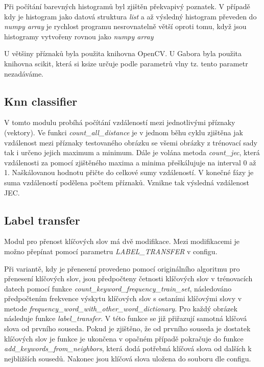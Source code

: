 \documentclass[czech,BP]{thesiskiv}
\begin{document}
\par Při počítání barevných histogramů byl zjištěn překvapivý poznatek. V případě kdy je histogram jako datová struktura \textit{list} a až výsledný histogram převeden do \textit{numpy array} je rychlost programu nesrovnatelně větší oproti tomu, když jsou histogramy vytvořeny rovnou jako \textit{numpy array}  

\par U většiny příznaků byla použita knihovna OpenCV. U Gabora byla použita knihovna scikit, která si ksize určuje podle parametrů vlny tz. tento parametr nezadáváme.
  
  
\subsection{Knn classifier}
\par V tomto modulu probíhá počítání vzdáleností mezi jednotlivými příznaky (vektory). Ve funkci \textit{count\_all\_distance} je v jednom běhu cyklu zjištěna jak vzdálenost mezi příznaky testovaného obrázku se všemi obrázky z trénovací sady tak i určeno jejich maximum a minimum. Dále je volána metoda \textit{count\_jec}, která vzdálenosti za pomocí zjištěného maxima a minima přeškálujuje na interval 0 až 1. Naškálovanou hodnotu přičte do celkové sumy vzdáleností. V konečné fázy je suma vzdáleností podělena počtem příznaků. Vznikne tak výsledná vzdálenost JEC.
    

\subsection{Label transfer}
\par Modul pro přenost klíčových slov má dvě modifikace. Mezi modifikacemi je možno přepínat pomocí parametru \textit{LABEL\_TRANSFER} v configu. 

\par Při variantě, kdy je přenesení provedeno pomocí originálního algoritmu pro přenesení klíčových slov, jsou předpočteny četnosti klíčových slov v trénovacích datech pomocí funkce \textit{count\_keyword\_frequency\_train\_set}, následováno předpočtením frekvence výskytu klíčových slov s ostaními klíčovými slovy v metode \textit{frequency\_word\_with\_other\_word\_dictionary}. Pro každý obrázek následuje funkce \textit{label\_transfer}. V této funkce se již přiřazují samotná klíčová slova od prvního souseda. Pokud je zjištěno, že od prvního souseda je dostatek klíčových slov je funkce je ukončena v opačném případě pokračuje do funkce \textit{add\_keywords\_from\_neighbors}, která dodá potřebná klíčová slova od dalších k nejbližších sousedů. Nakonec jsou klíčová slova uložena do souboru dle configu.
\end{document}

